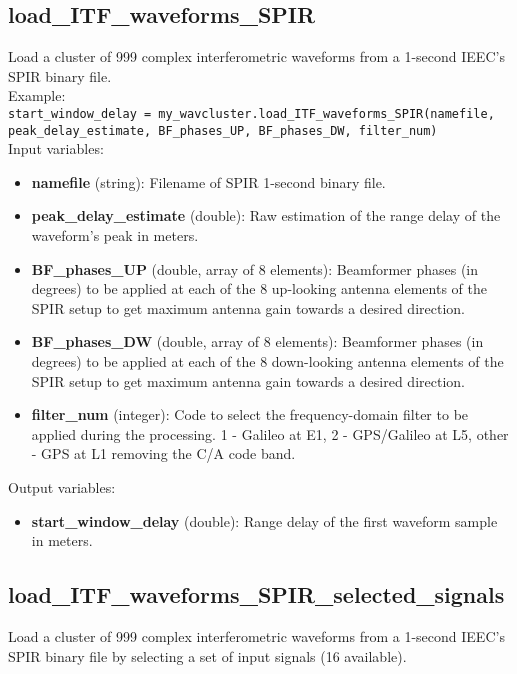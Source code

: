 \subsection{load\_ITF\_waveforms\_SPIR}

Load a cluster of 999 complex interferometric waveforms from a 1-second IEEC's SPIR binary file.\\

Example:\\

\texttt{start\_window\_delay = my\_wavcluster.load\_ITF\_waveforms\_SPIR(namefile, peak\_delay\_estimate, BF\_phases\_UP, BF\_phases\_DW, filter\_num)}\\

Input variables:
\begin{itemize}
\item {\bf namefile} (string): Filename of SPIR 1-second binary file.
\item {\bf peak\_delay\_estimate} (double): Raw estimation of the range delay of the waveform's peak in meters.
\item {\bf BF\_phases\_UP} (double, array of 8 elements): Beamformer phases (in degrees) to be applied at each of the 8 up-looking antenna elements of the SPIR setup to get maximum antenna gain towards a desired direction.
\item {\bf BF\_phases\_DW} (double, array of 8 elements): Beamformer phases (in degrees) to be applied at each of the 8 down-looking antenna elements of the SPIR setup to get maximum antenna gain towards a desired direction.
\item {\bf filter\_num} (integer): Code to select the frequency-domain filter to be applied during the processing. 1 - Galileo at E1, 2 - GPS/Galileo at L5, other - GPS at L1 removing the C/A code band. 
\end{itemize}

Output variables:
\begin{itemize}
\item {\bf start\_window\_delay} (double): Range delay of the first waveform sample in meters.
\end{itemize}


\subsection{load\_ITF\_waveforms\_SPIR\_selected\_signals}

Load a cluster of 999 complex interferometric waveforms from a 1-second IEEC's SPIR binary file by selecting a set of input signals (16 available).\\

